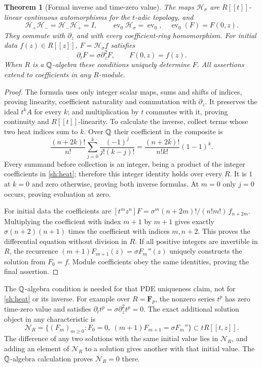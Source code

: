 \documentclass[11pt,a4paper]{article}
\newtheorem{theorem}{Theorem}[section]
\theoremstyle{definition}\newtheorem{definition}[theorem]{Definition}
\providecommand{\Ht}{\mathcal H}
\begin{document}
\begin{theorem}[Formal inverse and time-zero value]\label{sh:heatproperties}
The maps $\Ht_\sigma$ are $R[[t]]$-linear continuous
automorphisms for the $t$-adic topology, and
\begin{equation}\tag{SH16}\label{sh:inverseheat}
 \Ht_+\Ht_-=\Ht_-\Ht_+=I,\qquad
 \operatorname{ev}_0\Ht_\sigma=\operatorname{ev}_0,
 \quad\operatorname{ev}_0(F)=F(0,z).
\end{equation}
They commute with $\partial_z$ and with every coefficient-ring
homomorphism. For initial data $f(z)\in R[[z]]$,
$F=\Ht_\sigma f$ satisfies
\begin{equation}\tag{SH17}\label{sh:pde}
 \partial_tF=\sigma\partial_z^2F,\qquad F(0,z)=f(z).
\end{equation}
When $R$ is a $\mathbb Q$-algebra these conditions uniquely determine
$F$. All assertions extend to coefficients in any $R$-module.
\end{theorem}
\begin{proof}
The formula uses only integer scalar maps, sums and shifts of
indices, proving linearity, coefficient naturality and commutation
with $\partial_z$. It preserves the ideal $t^kA$ for every $k$;
and multiplication by $t$ commutes with it, proving continuity
and $R[[t]]$-linearity. To calculate the inverse, collect terms
whose two heat indices sum to $k$. Over $\mathbb Q$ their coefficient
in the composite is
\[
 \frac{(n+2k)!}{n!}
 \sum_{j=0}^k\frac{(-1)^j}{j!(k-j)!}
 =\frac{(n+2k)!}{n!k!}(1-1)^k.
\]
Every summand before collection is an integer, being a product
of the integer coefficients in \eqref{sh:heat}; therefore this
integer identity holds over every $R$. It is $1$ at $k=0$
and zero otherwise, proving both inverse formulas.
At $m=0$ only $j=0$ occurs, proving evaluation at zero.

For initial data the coefficients are
$[t^mz^n]F=\sigma^m(n+2m)!/(n!m!)\,f_{n+2m}$.
Multiplying the coefficient with index $m+1$ by $m+1$
gives exactly $\sigma(n+2)(n+1)$ times the coefficient with
indices $m,n+2$. This proves the differential equation without
division in $R$. If all positive integers are invertible in $R$,
the recurrence
$(m+1)F_{m+1}(z)=\sigma F_m''(z)$ uniquely constructs the
solution from $F_0=f$. Module coefficients obey the same
identities, proving the final assertion.
\end{proof}

The $\mathbb Q$-algebra condition is needed for that PDE uniqueness
claim, not for \eqref{sh:heat} or its inverse. For example over
$R=\mathbf F_p$, the nonzero series $t^p$ has zero time-zero
value and satisfies $\partial_t t^p=\sigma\partial_z^2t^p=0$.
The exact additional solution object in any characteristic is
\begin{equation}\tag{SH18}\label{sh:pdetorsion}
 \mathcal N_R=
 \{(F_m)_{m\ge0}:F_0=0,\ 
       (m+1)F_{m+1}=\sigma F_m''\}\subset tR[[t,z]].
\end{equation}
The difference of any two solutions with the same initial value
lies in $\mathcal N_R$, and adding an element of $\mathcal N_R$
to a solution gives another with that initial value. The
$\mathbb Q$-algebra calculation proves $\mathcal N_R=0$ there.
\end{document}
